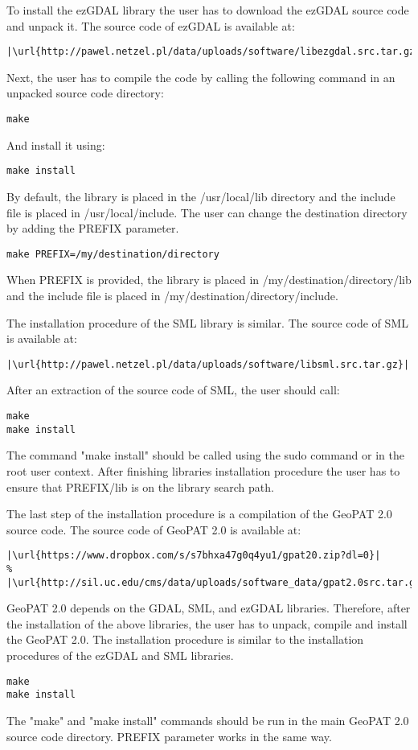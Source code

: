 To install the ezGDAL library the user has to download the ezGDAL source code and unpack it.
The source code of ezGDAL is available at:
\begin{lstlisting}[escapechar=|]
|\url{http://pawel.netzel.pl/data/uploads/software/libezgdal.src.tar.gz}|
\end{lstlisting}
Next, the user has to compile the code by calling the following command in an unpacked source code directory:
\begin{lstlisting}
make
\end{lstlisting}
And install it using:
\begin{lstlisting}
make install
\end{lstlisting}
By default, the library is placed in the /usr/local/lib directory and the include file is placed in /usr/local/include.
The user can change the destination directory by adding the PREFIX parameter.
\begin{lstlisting}
make PREFIX=/my/destination/directory
\end{lstlisting}
When PREFIX is provided, the library is placed in /my/destination/directory/lib and the include file is placed in /my/destination/directory/include.

The installation procedure of the SML library is similar.
The source code of SML is available at:
\begin{lstlisting}[escapechar=|]
|\url{http://pawel.netzel.pl/data/uploads/software/libsml.src.tar.gz}|
\end{lstlisting}
After an extraction of the source code of SML, the user should call: 
\begin{lstlisting}
make
make install
\end{lstlisting}
The command "make install" should be called using the sudo command or in the root user context.
After finishing libraries installation procedure the user has to ensure that PREFIX/lib is on the library search path.

The last step of the installation procedure is a compilation of the GeoPAT 2.0 source code.
The source code of GeoPAT 2.0 is available at:
\begin{lstlisting}[escapechar=|]
|\url{https://www.dropbox.com/s/s7bhxa47g0q4yu1/gpat20.zip?dl=0}|
% |\url{http://sil.uc.edu/cms/data/uploads/software_data/gpat2.0src.tar.gz}|
\end{lstlisting}
GeoPAT 2.0 depends on the GDAL, SML, and ezGDAL libraries.
Therefore, after the installation of the above libraries, the user has to unpack, compile and install the GeoPAT 2.0.
The installation procedure is similar to the installation procedures of the ezGDAL and SML libraries.
\begin{lstlisting}
make
make install
\end{lstlisting}
The "make" and "make install" commands should be run in the main GeoPAT 2.0 source code directory.
PREFIX parameter works in the same way.

